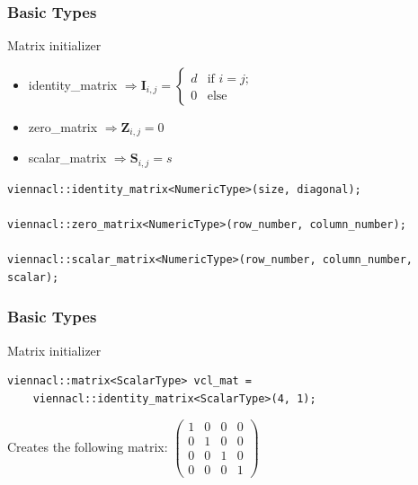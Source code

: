 \begin{frame}[fragile]
\frametitle{Basic Types}

\begin{block}{Matrix initializer}  
  \begin{itemize}
   \item identity\_matrix $\Rightarrow \textbf{I}_{i,j} = \left\{ \begin{array}{ll} d & \mbox{if $i = j$}; \\
                                                                     0 &  \mbox{else} \end{array} \right.$
   \item zero\_matrix $\Rightarrow \textbf{Z}_{i,j} = 0$
   \item scalar\_matrix $\Rightarrow \textbf{S}_{i,j} = s$
  \end{itemize}
  
  \begin{lstlisting}
viennacl::identity_matrix<NumericType>(size, diagonal);
    
viennacl::zero_matrix<NumericType>(row_number, column_number);
    
viennacl::scalar_matrix<NumericType>(row_number, column_number, scalar);
  \end{lstlisting}
\end{block}

\end{frame}



\begin{frame}[fragile]
\frametitle{Basic Types}

\begin{block}{Matrix initializer}
  \begin{lstlisting}
viennacl::matrix<ScalarType> vcl_mat =
    viennacl::identity_matrix<ScalarType>(4, 1);
  \end{lstlisting}
  
  \hspace{1cm}
  
  Creates the following matrix:
$\begin{pmatrix}
1 & 0 & 0 & 0 \\
0 & 1 & 0 & 0 \\
0 & 0 & 1 & 0 \\
0 & 0 & 0 & 1
\end{pmatrix}$
\end{block}

\end{frame}



